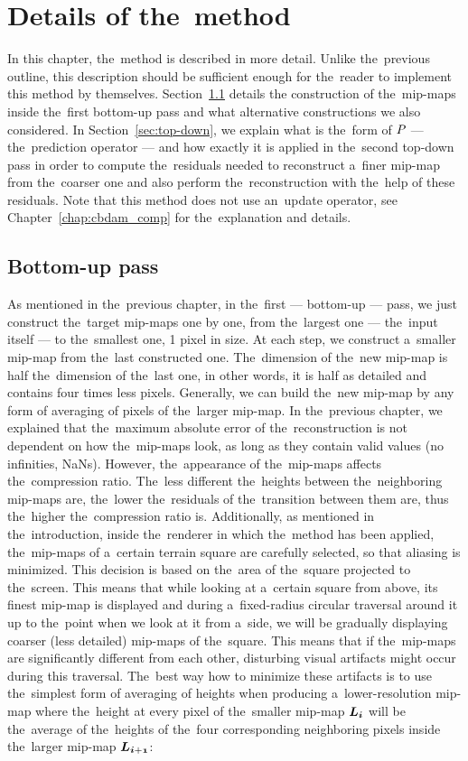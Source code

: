 \chapter{Details of the~method}\label{chap:details}

In this chapter, the~method is described in more detail. Unlike the~previous outline, this description should be sufficient enough for the~reader to implement this method by themselves. Section~\ref{sec:bottom-up} details the construction of the~mip-maps inside the~first bottom-up pass and what alternative constructions we also considered. In Section~\ref{sec:top-down}, we explain what is the~form of $\mathit{P_{}}$ --- the~prediction operator --- and how exactly it is applied in the~second top-down pass in order to compute the~residuals needed to reconstruct a~finer mip-map from the~coarser one and also perform the~reconstruction with the~help of these residuals. Note that this method does not use an~update operator, see Chapter~\ref{chap:cbdam_comp} for the~explanation and details.

\section{Bottom-up pass}\label{sec:bottom-up}
As mentioned in the~previous chapter, in the~first --- bottom-up --- pass, we just construct the~target mip-maps one by one, from the~largest one --- the~input itself --- to the~smallest one, 1 pixel in size. At each step, we construct a~smaller mip-map from the~last constructed one. The~dimension of the~new mip-map is half the~dimension of the~last one, in other words, it is half as detailed and contains four times less pixels. Generally, we can build the~new mip-map by any form of averaging of pixels of the~larger mip-map. In the~previous chapter, we explained that the~maximum absolute error of the~reconstruction is not dependent on how the~mip-maps look, as long as they contain valid values (no infinities, NaNs). However, the~appearance of the~mip-maps affects the~compression ratio. The~less different the~heights between the~neighboring mip-maps are, the~lower the~residuals of the~transition between them are, thus the~higher the~compression ratio is. Additionally, as mentioned in the~introduction, inside the~renderer in which the~method has been applied, the~mip-maps of a~certain terrain square are carefully selected, so that aliasing is minimized. This decision is based on the~area of the~square projected to the~screen. This means that while looking at a~certain square from above, its finest mip-map is displayed and during a~fixed-radius circular traversal around it up to the~point when we look at it fro\textsl{}m a~side, we will be gradually displaying coarser (less detailed) mip-maps of the~square. This means that if the~mip-maps are significantly different from each other, disturbing visual artifacts might occur during this traversal. The~best way how to minimize these artifacts is to use the~simplest form of averaging of heights when producing a~lower-resolution mip-map where the~height at every pixel of the~smaller mip-map $\lnorm{i}$ will be the~average of the~heights of the~four corresponding neighboring pixels inside the~larger mip-map $\lnorm{i+1}$:

